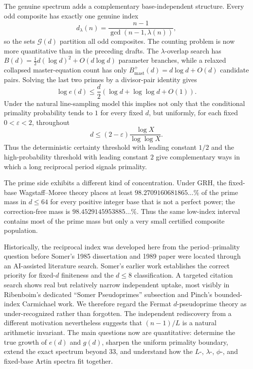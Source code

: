 \documentclass[11pt]{article}
\begin{document}
The genuine spectrum adds a complementary base-independent structure.  Every
odd composite has exactly one genuine index
\[
d_\lambda(n)=\frac{n-1}{\gcd(n-1,\lambda(n))},
\]
so the sets $\mathcal G(d)$ partition all odd composites.  The counting
problem is now more quantitative than in the preceding drafts.  The
$\lambda$-overlap search has
$B(d)=\frac12d(\log d)^2+O(d\log d)$ parameter branches, while a relaxed collapsed master-equation count has only
$B_{\mathrm{mast}}^{+}(d)=d\log d+O(d)$ candidate pairs.  Solving
the last two primes by a divisor-pair identity gives
\[
\log e(d)\le
\frac d2(\log d+\log\log d+O(1)).
\]
Under the natural line-sampling model this implies not only that the
conditional primality probability tends to $1$ for every fixed $d$, but
uniformly, for each fixed $0<\varepsilon<2$, throughout
\[
d\le(2-\varepsilon)\frac{\log X}{\log\log X}.
\]
Thus the deterministic certainty threshold with leading constant $1/2$ and
the high-probability threshold with leading constant $2$ give complementary
ways in which a long reciprocal period signals primality.

The prime side exhibits a different kind of concentration.  Under GRH, the
fixed-base Wagstaff--Moree theory places at least
$98.2709160681865\ldots\%$ of the prime mass in $d\le64$ for every positive
integer base that is not a perfect power; the correction-free mass is
$98.4529145953885\ldots\%$.  Thus the same low-index interval contains most of
the prime mass but only a very small certified composite population.

Historically, the reciprocal index was developed here from the period--primality
question before Somer's 1985 dissertation and 1989 paper were located through
an AI-assisted literature search.  Somer's earlier work establishes the
correct priority for fixed-$d$ finiteness and the $d\le8$ classification.
A targeted citation search shows real but relatively narrow independent uptake,
most visibly in Ribenboim's dedicated ``Somer Pseudoprimes'' subsection and
Pinch's bounded-index Carmichael work.  We therefore regard the Fermat
$d$-pseudoprime theory as under-recognized rather than forgotten.  The
independent rediscovery from a different motivation nevertheless suggests that
$(n-1)/L$ is a natural arithmetic invariant.  The main questions now are
quantitative: determine the true growth of $e(d)$ and $g(d)$, sharpen the
uniform primality boundary, extend the exact spectrum beyond $33$, and
understand how the $L$-, $\lambda$-, $\phi$-, and fixed-base Artin spectra fit
together.
\end{document}
